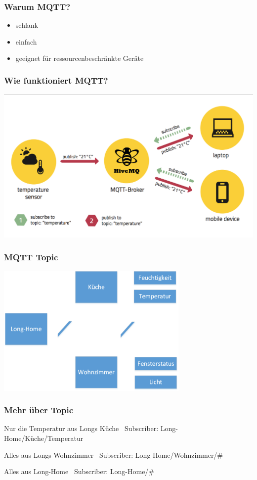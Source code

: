 \documentclass[11pt]{beamer}
\begin{document}
\begin{frame}
	\frametitle{Warum MQTT?} 
	\begin{itemize}
		\item schlank
		\item einfach
		\item geeignet für ressourcenbeschränkte Geräte
	\end{itemize}
\end{frame}

\begin{frame}
	\frametitle{Wie funktioniert MQTT?} 
	\includegraphics[width=1\textwidth]{hivemq.png}
\end{frame}

\begin{frame}
	\frametitle{MQTT Topic}
	\begin{center}
		\includegraphics[width=0.7\textwidth]{mqtttopic.png}
	\end{center}
\end{frame}

\begin{frame}
	\frametitle{Mehr über Topic} 
	\begin{exampleblock}
		{Nur die Temperatur aus Longs Küche} \ Subscriber: Long-Home/Küche/Temperatur
	\end{exampleblock}
	\begin{exampleblock}
		{Alles aus Longs Wohnzimmer} \ Subscriber: Long-Home/Wohnzimmer/\#
	\end{exampleblock}
	\begin{exampleblock}
		{Alles aus Long-Home} \ Subscriber: Long-Home/\#
	\end{exampleblock}
\end{frame}
\end{document}
